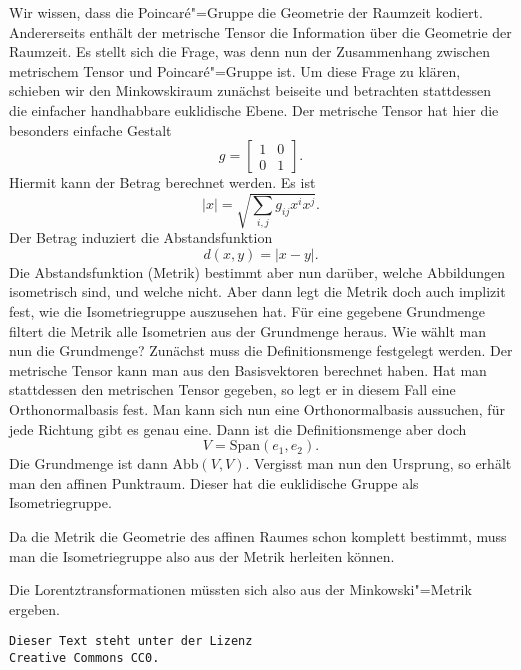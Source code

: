 \documentclass[a4paper,11pt,fleqn,twocolumn,twoside,dvipdfmx]{scrartcl}
\begin{document}
Wir wissen, dass die Poincaré"=Gruppe die Geometrie der Raumzeit
kodiert. Andererseits enthält der metrische Tensor die Information
über die Geometrie der Raumzeit. Es stellt sich die Frage, was denn
nun der Zusammenhang zwischen metrischem Tensor und Poincaré"=Gruppe
ist. Um diese Frage zu klären, schieben wir den Minkowskiraum zunächst
beiseite und betrachten stattdessen die einfacher handhabbare
euklidische Ebene. Der metrische Tensor hat hier die besonders
einfache Gestalt%
\[g=\begin{bmatrix}
1 & 0\\
0 & 1
\end{bmatrix}.\]
Hiermit kann der Betrag berechnet werden. Es ist%
\[|x| = \sqrt{\sum_{i,j}g_{ij}x^ix^j}.\]
Der Betrag induziert die Abstandsfunktion%
\[d(x,y) = |x-y|.\]
Die Abstandsfunktion (Metrik) bestimmt aber nun darüber, welche
Abbildungen isometrisch sind, und welche nicht. Aber dann legt die
Metrik doch auch implizit fest, wie die Isometriegruppe auszusehen hat.
Für eine gegebene Grundmenge filtert die Metrik alle Isometrien aus
der Grundmenge heraus. Wie wählt man nun die Grundmenge? Zunächst muss
die Definitionsmenge festgelegt werden. Der metrische Tensor kann man
aus den Basisvektoren berechnet haben. Hat man stattdessen den
metrischen Tensor gegeben, so legt er in diesem Fall eine
Orthonormalbasis fest. Man kann sich nun eine Orthonormalbasis
aussuchen, für jede Richtung gibt es genau eine. Dann ist die
Definitionsmenge aber doch%
\[V = \mathrm{Span}(e_1,e_2).\]
Die Grundmenge ist dann $\mathrm{Abb}(V,V)$. Vergisst man nun den
Ursprung, so erhält man den affinen Punktraum. Dieser hat die
euklidische Gruppe als Isometriegruppe.

Da die Metrik die Geometrie des affinen Raumes schon komplett bestimmt,
muss man die Isometriegruppe also aus der Metrik herleiten können.

Die Lorentztransformationen müssten sich also aus der Minkowski"=Metrik
ergeben.

\newpage
\mbox{}
\vfill\noindent
\texttt{Dieser Text steht unter der Lizenz\\
Creative Commons CC0.}
\end{document}
